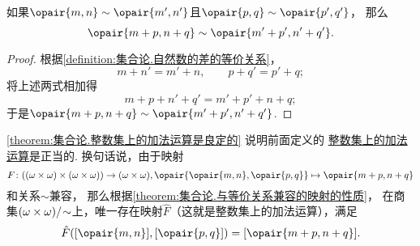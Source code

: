 \begin{lemma}\label{theorem:集合论.整数集上的加法运算是良定的}
如果\(\opair{m,n}\sim\opair{m',n'}\)且\(\opair{p,q}\sim\opair{p',q'}\)，
那么\[
	\opair{m+p,n+q}\sim\opair{m'+p',n'+q'}.
\]
\begin{proof}
根据\cref{definition:集合论.自然数的差的等价关系}，
\[
	m+n'=m'+n, \qquad
	p+q'=p'+q;
\]
将上述两式相加得\[
	m+p+n'+q'=m'+p'+n+q;
\]
于是\(\opair{m+p,n+q}\sim\opair{m'+p',n'+q'}\).
\end{proof}
\end{lemma}
\cref{theorem:集合论.整数集上的加法运算是良定的} 说明前面定义的%
\hyperref[equation:集合论.整数集上的加法运算]{整数集上的加法运算}是正当的.
换句话说，由于映射\[
	F\colon ((\omega\times\omega)\times(\omega\times\omega))\to(\omega\times\omega),
	\opair{\opair{m,n},\opair{p,q}} \mapsto \opair{m+p,n+q}
\]和关系\(\sim\)兼容，
那么根据\cref{theorem:集合论.与等价关系兼容的映射的性质}，
在商集\((\omega\times\omega)/\kern-2pt\sim\)上，唯一存在映射\(\hat{F}\)（这就是整数集上的加法运算），满足\[
	\hat{F}([\opair{m,n}],[\opair{p,q}]) = [\opair{m+p,n+q}].
\]


